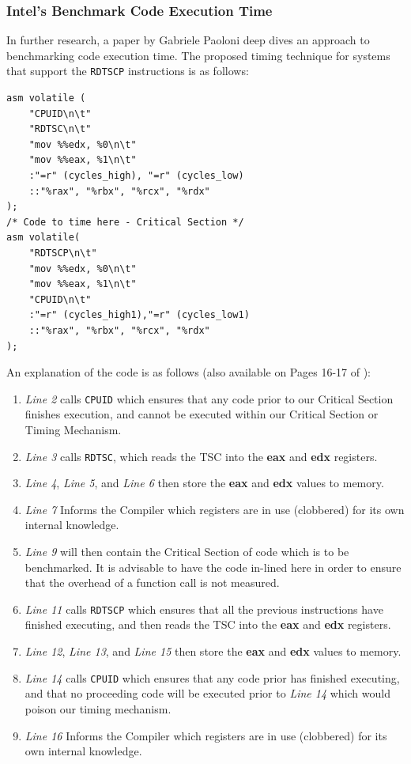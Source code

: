 \documentclass[bsc,frontabs,twoside,singlespacing,parskip,deptreport]{infthesis}     %
\begin{document}
\subsubsection{Intel's Benchmark Code Execution Time\cite{code_exec_times}}
In further research, a paper\cite{code_exec_times} by Gabriele Paoloni deep dives an approach to benchmarking code execution time. The proposed timing technique for systems that support the \texttt{RDTSCP} instructions is as follows:
\begin{verbatim}
asm volatile (
    "CPUID\n\t"
    "RDTSC\n\t"
    "mov %%edx, %0\n\t"
    "mov %%eax, %1\n\t"
    :"=r" (cycles_high), "=r" (cycles_low)
    ::"%rax", "%rbx", "%rcx", "%rdx"
);
/* Code to time here - Critical Section */
asm volatile(
    "RDTSCP\n\t"
    "mov %%edx, %0\n\t"
    "mov %%eax, %1\n\t"
    "CPUID\n\t"
    :"=r" (cycles_high1),"=r" (cycles_low1)
    ::"%rax", "%rbx", "%rcx", "%rdx"
);
\end{verbatim}
An explanation of the code is as follows (also available on Pages 16-17 of \cite{code_exec_times}):
\begin{enumerate}
    \item \textit{Line 2} calls \texttt{CPUID} which ensures that any code prior to our Critical Section finishes execution, and cannot be executed within our Critical Section or Timing Mechanism.
    \item \textit{Line 3} calls \texttt{RDTSC}, which reads the TSC into the \textbf{eax} and \textbf{edx} registers.
    \item \textit{Line 4}, \textit{Line 5}, and \textit{Line 6} then store the \textbf{eax} and \textbf{edx} values to memory.
    \item \textit{Line 7} Informs the Compiler which registers are in use (clobbered) for its own internal knowledge.
    \item \textit{Line 9} will then contain the Critical Section of code which is to be benchmarked. It is advisable to have the code in-lined here in order to ensure that the overhead of a function call is not measured.
    \item \textit{Line 11} calls \texttt{RDTSCP} which ensures that all the previous instructions have finished executing, and then reads the TSC into the \textbf{eax} and \textbf{edx} registers.
    \item \textit{Line 12}, \textit{Line 13}, and \textit{Line 15} then store the \textbf{eax} and \textbf{edx} values to memory.
    \item \textit{Line 14} calls \texttt{CPUID} which ensures that any code prior has finished executing, and that no proceeding code will be executed prior to \textit{Line 14} which would poison our timing mechanism.
    \item \textit{Line 16} Informs the Compiler which registers are in use (clobbered) for its own internal knowledge.
\end{enumerate}
\end{document}
